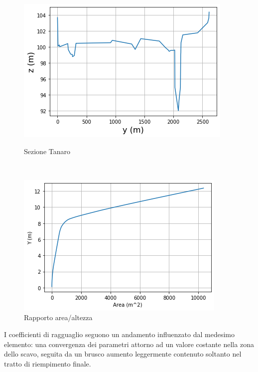 \documentclass[12pt]{article} %
\begin{document}
\begin{figure}[H]
\begin{minipage}[b]{8.5cm}
\centering
    \includegraphics[width=1 \textwidth]{sezioneta.png}
    \caption{Sezione Tanaro}
    \label{fig:Tanaro_sezione}
\end{minipage}
\ \hspace{2mm} \hspace{3mm} \
\begin{minipage}[b]{8.5cm}
    \centering
    \includegraphics[width=1 \textwidth]{rapporto area altezzata.png}
    \caption{Rapporto area/altezza}
    \label{fig:Tanaro_area/altezza}
\end{minipage}
\end{figure}

\noindent I coefficienti di ragguaglio seguono un andamento influenzato dal medesimo elemento: una convergenza dei parametri attorno ad un valore costante nella zona dello scavo, seguita da un brusco aumento leggermente contenuto soltanto nel tratto di riempimento finale.
\end{document}
